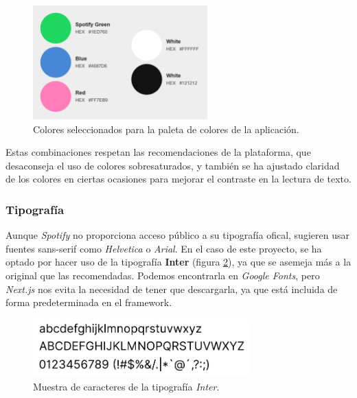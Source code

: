 \begin{figure}[H]
    \centering
    \includegraphics[width=0.6\textwidth]{figures/colores_usados.png}
    \caption{Colores seleccionados para la paleta de colores de la aplicación.}
    \label{fig:colores_usados}
\end{figure}

Estas combinaciones respetan las recomendaciones de la plataforma, que desaconseja el uso de colores sobresaturados, y también se ha ajustado claridad de los colores en ciertas ocasiones para mejorar el contraste en la lectura de texto.

\newpage

\subsubsection*{Tipografía}

Aunque \textit{Spotify} no proporciona acceso público a su tipografía ofical, sugieren usar fuentes sans-serif como \textit{Helvetica} o \textit{Arial}. En el caso de este proyecto, se ha optado por hacer uso de la tipografía \textbf{Inter} (figura \ref{fig:inter_fuente}), ya que se asemeja más a la original que las recomendadas. Podemos encontrarla en \textit{Google Fonts}, pero \textit{Next.js} nos evita la necesidad de tener que descargarla, ya que está incluida de forma predeterminada en el framework.

\begin{figure}[H]
    \centering
    \includegraphics[width=0.75\textwidth]{figures/inter_fuente.png}
    \caption{Muestra de caracteres de la tipografía \textit{Inter}.}
    \label{fig:inter_fuente}
\end{figure}

